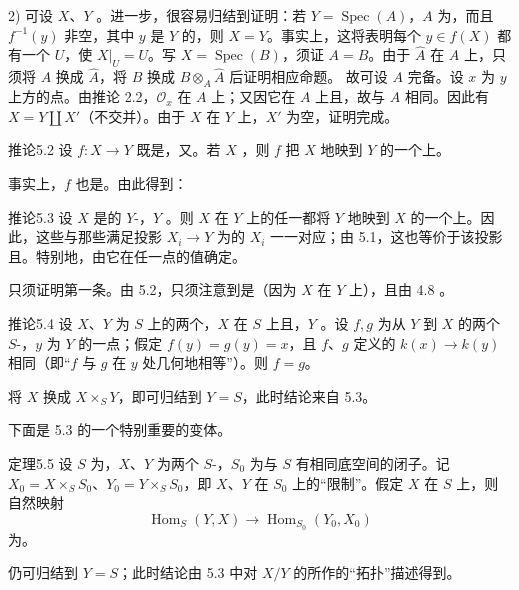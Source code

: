 2) 可设 $X$、$Y$ 。进一步，很容易归结到证明：若 $Y=\operatorname{Spec}(A)$，$A$ 为，而且 $f^{-1}(y)$ 非空，其中 $y$ 是 $Y$ 的，则 $X=Y$。事实上，这将表明每个 $y\in f(X)$ 都有一个 $U$，使 $X|_U=U$。写 $X=\operatorname{Spec}(B)$，须证 $A=B$。由于 $\widehat A$ 在 $A$ 上，只须将 $A$ 换成 $\widehat A$，将 $B$ 换成 $B\otimes_A\widehat A$ 后证明相应命题。
故可设 $A$ 完备。设 $x$ 为 $y$ 上方的点。由推论 2.2，$\mathcal O_x$ 在 $A$ 上；又因它在 $A$ 上且，故与 $A$ 相同。因此有 $X=Y\amalg X'$（不交并）。由于 $X$ 在 $Y$ 上，$X'$ 为空，证明完成。
\begin{SGAresult}{推论}{5.2}
设 $f\colon X\to Y$ 既是，又。若 $X$ ，则 $f$ 把 $X$ 地映到 $Y$ 的一个上。
\end{SGAresult}
事实上，$f$ 也是。由此得到：
\begin{SGAresult}{推论}{5.3}
设 $X$ 是的 $Y$-，$Y$ 。则 $X$ 在 $Y$ 上的任一都将 $Y$ 地映到 $X$ 的一个上。因此，这些与那些满足投影 $X_i\to Y$ 为的 $X_i$ 一一对应；由 5.1，这也等价于该投影且。特别地，由它在任一点的值确定。
\end{SGAresult}
只须证明第一条。由 5.2，只须注意到是（因为 $X$ 在 $Y$ 上），且由 4.8 。
\begin{SGAresult}{推论}{5.4}
设 $X$、$Y$ 为 $S$ 上的两个，$X$ 在 $S$ 上且，$Y$ 。设 $f,g$ 为从 $Y$ 到 $X$ 的两个 $S$-，$y$ 为 $Y$ 的一点；假定 $f(y)=g(y)=x$，且 $f$、$g$ 定义的 $k(x)\to k(y)$ 相同（即“$f$ 与 $g$ 在 $y$ 处几何地相等”）。则 $f=g$。
\end{SGAresult}
将 $X$ 换成 $X\times_S Y$，即可归结到 $Y=S$，此时结论来自 5.3。

下面是 5.3 的一个特别重要的变体。
\begin{SGAresult}{定理}{5.5}
设 $S$ 为，$X$、$Y$ 为两个 $S$-，$S_0$ 为与 $S$ 有相同底空间的闭子。记 $X_0=X\times_S S_0$、$Y_0=Y\times_S S_0$，即 $X$、$Y$ 在 $S_0$ 上的“限制”。假定 $X$ 在 $S$ 上，则自然映射
\[
 \operatorname{Hom}_S(Y,X)\longrightarrow\operatorname{Hom}_{S_0}(Y_0,X_0)
\]
为。
\end{SGAresult}
仍可归结到 $Y=S$；此时结论由 5.3 中对 $X/Y$ 的所作的“拓扑”描述得到。

